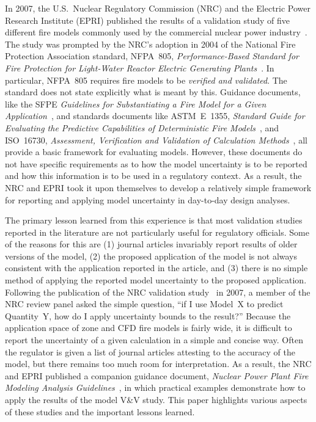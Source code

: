 \documentclass[fleqn,b5paper]{article}
\begin{document}
In 2007, the U.S.~Nuclear Regulatory Commission (NRC) and the Electric Power Research Institute (EPRI) published the results of a validation study of five different fire models commonly used by the commercial nuclear power industry~\cite{NUREG_1824}. The study was prompted by the NRC's adoption in 2004 of the National Fire Protection Association standard, NFPA~805, {\em Performance-Based Standard for Fire Protection for Light-Water Reactor Electric Generating Plants}~\cite{NFPA_805}. In particular, NFPA~805 requires fire models to be {\em verified and validated}. The standard does not state explicitly what is meant by this. Guidance documents, like the SFPE {\em Guidelines for Substantiating a Fire Model for a Given Application}~\cite{SFPE_G.06}, and standards documents like ASTM~E~1355, {\em Standard Guide for Evaluating the Predictive Capabilities of Deterministic Fire Models}~\cite{ASTM:E1355}, and ISO~16730, {\em Assessment, Verification and Validation of Calculation Methods}~\cite{ISO16730}, all provide a basic framework for evaluating models. However, these documents do not have specific requirements as to how the model uncertainty is to be reported and how this information is to be used in a regulatory context. As a result, the NRC and EPRI took it upon themselves to develop a relatively simple framework for reporting and applying model uncertainty in day-to-day design analyses.

The primary lesson learned from this experience is that most validation studies reported in the literature are not particularly useful for regulatory officials. Some of the reasons for this are (1) journal articles invariably report results of older versions of the model, (2) the proposed application of the model is not always consistent with the application reported in the article, and (3) there is no simple method of applying the reported model uncertainty to the proposed application. Following the publication of the NRC validation study~\cite{NUREG_1824} in 2007, a member of the NRC review panel asked the simple question, ``if I use Model~X to predict Quantity~Y, how do I apply uncertainty bounds to the result?'' Because the application space of zone and CFD fire models is fairly wide, it is difficult to report the uncertainty of a given calculation in a simple and concise way. Often the regulator is given a list of journal articles attesting to the accuracy of the model, but there remains too much room for interpretation. As a result, the NRC and EPRI published a companion guidance document, {\em Nuclear Power Plant Fire Modeling Analysis Guidelines}~\cite{NUREG_1934}, in which practical examples demonstrate how to apply the results of the model V\&V study. This paper highlights various aspects of these studies and the important lessons learned.
\end{document}
